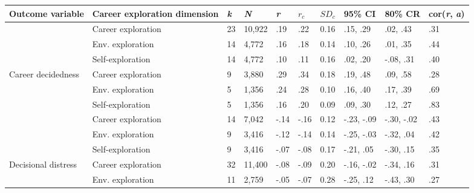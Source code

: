 \begin{table}[ht]
\centering
\begin{tabular}{llllllllll}
  \hline
Outcome variable & Career exploration dimension & \textit{k} & \textit{N} & \textit{r} & \textit{$r_c$} & \textit{$SD_c$} & 95\% CI & 80\% CR & cor(\textit{r}, \textit{a})  \\ 
  \hline
{} & Career exploration & 23 & 10,922 & .19 & .22 & 0.16 & .15, .29 & .02, .43 & .31 \\ 
   & \hspace{0.8em}Env. exploration & 14 & 4,772 & .16 & .18 & 0.14 & .10, .26 & .01, .35 & .44 \\ 
   & \hspace{0.8em}Self-exploration & 14 & 4,772 & .10 & .11 & 0.16 & .02, .20 & -.08, .31 & .40 \\ 
  Career decidedness & Career exploration & 9 & 3,880 & .29 & .34 & 0.18 & .19, .48 & .09, .58 & .28 \\ 
   & \hspace{0.8em}Env. exploration & 5 & 1,356 & .24 & .28 & 0.10 & .16, .40 & .17, .39 & .69 \\ 
   & \hspace{0.8em}Self-exploration & 5 & 1,356 & .16 & .20 & 0.09 & .09, .30 & .12, .27 & .83 \\ 
   & Career exploration & 14 & 7,042 & -.14 & -.16 & 0.12 & -.23, -.09 & -.30, -.02 & .43 \\ 
   & \hspace{0.8em}Env. exploration & 9 & 3,416 & -.12 & -.14 & 0.14 & -.25, -.03 & -.32, .04 & .42 \\ 
   & \hspace{0.8em}Self-exploration & 9 & 3,416 & -.07 & -.08 & 0.17 & -.21, .05 & -.30, .15 & .35 \\ 
  Decisional distress & Career exploration & 32 & 11,400 & -.08 & -.09 & 0.20 & -.16, -.02 & -.34, .16 & .31 \\ 
   & \hspace{0.8em}Env. exploration & 11 & 2,759 & -.05 & -.07 & 0.28 & -.25, .12 & -.43, .30 & .27 \\ 

\end{tabular}
\end{table}
